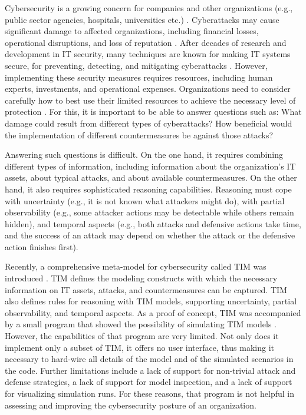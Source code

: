 \documentclass{llncs}
\begin{document}
Cybersecurity is a growing concern for companies and other organizations (e.g., public sector agencies, hospitals, universities etc.) \cite{admass2024cyber}.
Cyberattacks may cause significant damage to affected organizations, including financial losses, operational disruptions, and loss of reputation \cite{woods2021sok}.
After decades of research and development in IT security, many techniques are known for making IT systems secure, for preventing, detecting, and mitigating cyberattacks \cite{de2024whole}.
However, implementing these security measures requires resources, including human experts, investments, and operational expenses.
Organizations need to consider carefully how to best use their limited resources to achieve the necessary level of protection \cite{franco2024rcvar}.
For this, it is important to be able to answer questions such as:
What damage could result from different types of cyberattacks?
How beneficial would the implementation of different countermeasures be against those attacks?

Answering such questions is difficult.
On the one hand, it requires combining different types of information, including information about the organization's IT assets, about typical attacks, and about available countermeasures.
On the other hand, it also requires sophisticated reasoning capabilities.
Reasoning must cope with uncertainty (e.g., it is not known what attackers might do), with partial observability (e.g., some attacker actions may be detectable while others remain hidden), and temporal aspects (e.g., both attacks and defensive actions take time, and the success of an attack may depend on whether the attack or the defensive action finishes first).

Recently, a comprehensive meta-model for cybersecurity called TIM was introduced \cite{mann2025time}.
TIM defines the modeling constructs with which the necessary information on IT assets, attacks, and countermeasures can be captured.
TIM also defines rules for reasoning with TIM models, supporting uncertainty, partial observability, and temporal aspects.
As a proof of concept, TIM was accompanied by a small program that showed the possibility of simulating TIM models \cite{mann2025time}.
However, the capabilities of that program are very limited.
Not only does it implement only a subset of TIM, it offers no user interface, thus making it necessary to hard-wire all details of the model and of the simulated scenarios in the code.
Further limitations include a lack of support for non-trivial attack and defense strategies, a lack of support for model inspection, and a lack of support for visualizing simulation runs.
For these reasons, that program is not helpful in assessing and improving the cybersecurity posture of an organization.
\end{document}
